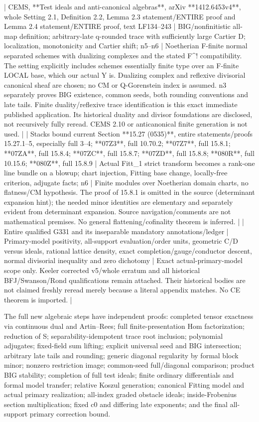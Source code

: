 \documentclass[11pt]{article}
\begin{document}
| CEMS, **Test ideals and anti-canonical algebras**, arXiv **1412.6453v4**, whole Setting 2.1, Definition 2.2, Lemma 2.3 statement/ENTIRE proof and Lemma 2.4 statement/ENTIRE proof, text LF134--243 | BIG/nonfinitistic all-map definition; arbitrary-late q-rounded trace with sufficiently large Cartier D; localization, monotonicity and Cartier shift; n5--n6 | Noetherian F-finite normal separated schemes with dualizing complexes and the stated F\textasciicircum{}! compatibility. The setting explicitly includes schemes essentially finite type over an F-finite LOCAL base, which our actual Y is. Dualizing complex and reflexive divisorial canonical sheaf are chosen; no CM or Q-Gorenstein index is assumed. n3 separately proves BIG existence, common seeds, both rounding conventions and late tails. Finite duality/reflexive trace identification is this exact immediate published application. Its historical duality and divisor foundations are disclosed, not recursively fully reread. CEMS 2.10 or anticanonical finite generation is not used. |
| Stacks bound current Section **15.27 (0535)**, entire statements/proofs 15.27.1--5, especially full 3--4; **07Z3**, full 10.70.2; **07Z7**, full 15.8.1; **07ZA**, full 15.8.4; **07ZC**, full 15.8.7; **07ZD**, full 15.8.8; **080R**, full 10.15.6; **080Z**, full 15.8.9 | Actual Fitt\_1 strict transform becomes a rank-one line bundle on a blowup; chart injection, Fitting base change, locally-free criterion, adjugate facts; n6 | Finite modules over Noetherian domain charts, no flatness/CM hypothesis. The proof of 15.8.1 is omitted in the source (determinant expansion hint); the needed minor identities are elementary and separately evident from determinant expansion. Source navigation/comments are not mathematical premises. No general flattening/cofinality theorem is inferred. |
| Entire qualified G331 and its inseparable mandatory annotations/ledger | Primary-model positivity, all-support evaluation/order units, geometric C/D versus ideals, rational lattice density, exact completion/gauge/conductor descent, normal divisorial inequality and zero dichotomy | Exact actual-primary-model scope only. Keeler corrected v5/whole erratum and all historical BFJ/Swanson/Rond qualifications remain attached. Their historical bodies are not claimed freshly reread merely because a literal appendix matches. No CE theorem is imported. |

The full new algebraic steps have independent proofs: completed tensor exactness via continuous dual and Artin--Rees; full finite-presentation Hom factorization; reduction of S; separability-idempotent trace root inclusion; polynomial adjugates; fixed-field sum lifting; explicit universal seed and BIG intersection; arbitrary late tails and rounding; generic diagonal regularity by formal block minor; nonzero restriction image; common-seed full/diagonal comparison; product BIG stability; completion of full test ideals; finite ordinary differentials and formal model transfer; relative Koszul generation; canonical Fitting model and actual primary realization; all-index graded obstacle ideals; inside-Frobenius section multiplication; fixed c0 and differing late exponents; and the final all-support primary correction bound.
\end{document}
